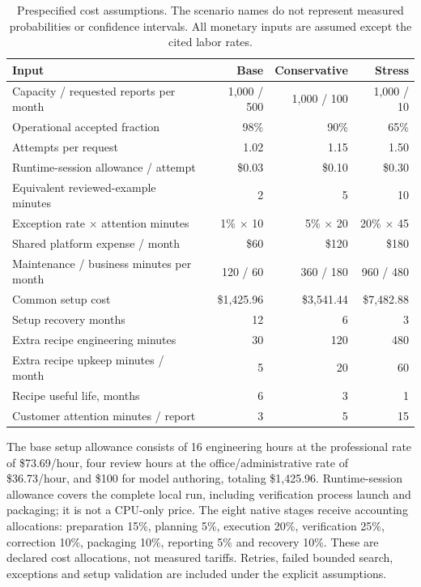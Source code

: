 \documentclass[11pt,letterpaper]{article}
\newcommand{\usd}[1]{\$#1}
\begin{document}
\begin{table}[htbp]
\small
\caption{Prespecified cost assumptions. The scenario names do not represent measured probabilities or confidence intervals. All monetary inputs are assumed except the cited labor rates.}
\label{tab:assumptions}
\begin{tabularx}{\textwidth}{@{}Yrrr@{}}\toprule
Input & Base & Conservative & Stress\\\midrule
Capacity / requested reports per month & 1,000 / 500 & 1,000 / 100 & 1,000 / 10\\
Operational accepted fraction & 98\% & 90\% & 65\%\\
Attempts per request & 1.02 & 1.15 & 1.50\\
Runtime-session allowance / attempt & \usd{0.03} & \usd{0.10} & \usd{0.30}\\
Equivalent reviewed-example minutes & 2 & 5 & 10\\
Exception rate $\times$ attention minutes & 1\% $\times$ 10 & 5\% $\times$ 20 & 20\% $\times$ 45\\
Shared platform expense / month & \usd{60} & \usd{120} & \usd{180}\\
Maintenance / business minutes per month & 120 / 60 & 360 / 180 & 960 / 480\\
Common setup cost & \usd{1,425.96} & \usd{3,541.44} & \usd{7,482.88}\\
Setup recovery months & 12 & 6 & 3\\
Extra recipe engineering minutes & 30 & 120 & 480\\
Extra recipe upkeep minutes / month & 5 & 20 & 60\\
Recipe useful life, months & 6 & 3 & 1\\
Customer attention minutes / report & 3 & 5 & 15\\\bottomrule
\end{tabularx}
\end{table}

The base setup allowance consists of 16 engineering hours at the professional rate of \usd{73.69}/hour, four review hours at the office/administrative rate of \usd{36.73}/hour, and \usd{100} for model authoring, totaling \usd{1,425.96}. Runtime-session allowance covers the complete local run, including verification process launch and packaging; it is not a CPU-only price. The eight native stages receive accounting allocations: preparation 15\%, planning 5\%, execution 20\%, verification 25\%, correction 10\%, packaging 10\%, reporting 5\% and recovery 10\%. These are declared cost allocations, not measured tariffs. Retries, failed bounded search, exceptions and setup validation are included under the explicit assumptions.
\end{document}
